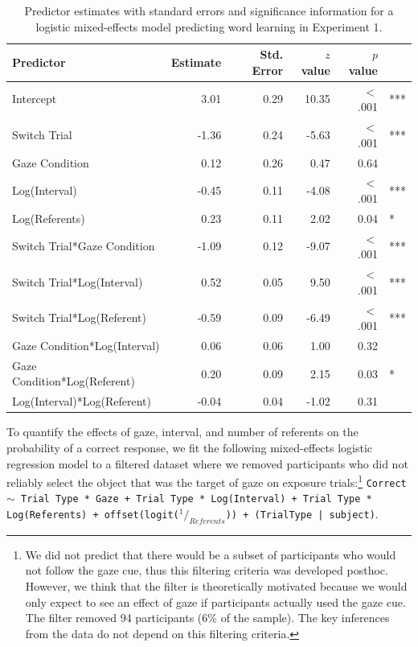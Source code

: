 \documentclass[authoryear, review]{elsarticle}
\begin{document}
\begin{table}[tb]
\centering
\begin{tabular}{lrrrrl}
 Predictor & Estimate & Std. Error & $z$ value & $p$ value &  \\ 
  \hline
Intercept & 3.01 & 0.29 & 10.35 & $<$ .001 & *** \\ 
  Switch Trial & -1.36 & 0.24 & -5.63 & $<$ .001 & *** \\ 
  Gaze Condition & 0.12 & 0.26 & 0.47 & 0.64 &  \\ 
  Log(Interval) & -0.45 & 0.11 & -4.08 & $<$ .001 & *** \\ 
  Log(Referents) & 0.23 & 0.11 & 2.02 & 0.04 & * \\ 
  Switch Trial*Gaze Condition & -1.09 & 0.12 & -9.07 & $<$ .001 & *** \\ 
  Switch Trial*Log(Interval) & 0.52 & 0.05 & 9.50 & $<$ .001 & *** \\ 
  Switch Trial*Log(Referent) & -0.59 & 0.09 & -6.49 & $<$ .001 & *** \\ 
  Gaze Condition*Log(Interval) & 0.06 & 0.06 & 1.00 & 0.32 &  \\ 
  Gaze Condition*Log(Referent) & 0.20 & 0.09 & 2.15 & 0.03 & * \\ 
  Log(Interval)*Log(Referent) & -0.04 & 0.04 & -1.02 & 0.31 &  \\ 
   \hline
\end{tabular}
\caption{Predictor estimates with standard errors and significance information for a logistic mixed-effects model predicting word learning in Experiment 1.} 
\label{tab:exp1_reg}
\end{table}

To quantify the effects of gaze, interval, and number of referents on
the probability of a correct response, we fit the following
mixed-effects logistic regression model to a filtered dataset where we
removed participants who did not reliably select the object that was the
target of gaze on exposure trials:\footnote{We did not predict that
  there would be a subset of participants who would not follow the gaze
  cue, thus this filtering criteria was developed posthoc. However, we
  think that the filter is theoretically motivated because we would only
  expect to see an effect of gaze if participants actually used the gaze
  cue. The filter removed 94 participants (6\% of the sample). The key
  inferences from the data do not depend on this filtering criteria.}
\texttt{Correct $\sim$ Trial Type * Gaze + Trial Type * Log(Interval) + Trial Type * \\ Log(Referents) + offset(logit($^1/_{Referents}$)) + (TrialType | subject)}.
\end{document}

